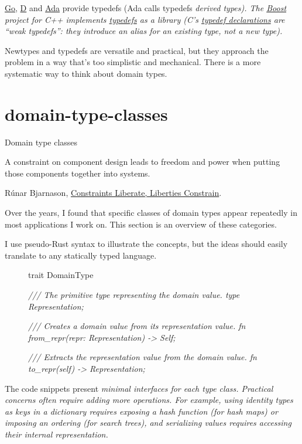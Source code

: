 \documentclass{article}
\begin{document}
\href{https://go.dev/ref/spec#Type_definitions}{Go}, \href{https://dlang.org/library/std/typecons/typedef.html}{D} and \href{https://en.wikibooks.org/wiki/Ada_Programming/Type_System#Derived_types}{Ada} provide typedefs (Ada calls typedefs \em{derived types}).
The \href{https://www.boost.org/}{Boost} project for C++ implements \href{https://www.boost.org/doc/libs/1_61_0/libs/serialization/doc/strong_typedef.html}{typedefs} as a library
(C's \href{https://en.cppreference.com/w/c/language/typedef}{typedef declarations} are ``weak typedefs'': they introduce an alias for an existing type, not a new type).

Newtypes and typedefs are versatile and practical, but they approach the problem in a way that's too simplistic and mechanical.
There is a more systematic way to think about domain types.

\section{domain-type-classes}{Domain type classes}

\epigraph{A constraint on component design leads to freedom and power when putting those components together into systems.}{
  Rúnar Bjarnason, \href{https://www.youtube.com/watch?v=GqmsQeSzMdw}{Constraints Liberate, Liberties Constrain}.
}

Over the years, I found that specific classes of domain types appear repeatedly in most applications I work on.
This section is an overview of these categories.

I use pseudo-Rust syntax to illustrate the concepts, but the ideas should easily translate to any statically typed language.

\begin{figure}
\begin{code}
trait DomainType {
  \em{/// The primitive type representing the domain value.}
  type Representation; \label{representation-type}

  \em{/// Creates a domain value from its representation value.}
  fn from_repr(repr: Representation) -> Self;

  \em{/// Extracts the representation value from the domain value.}
  fn to_repr(self) -> Representation;
}
\end{code}
\end{figure}

The code snippets present \em{minimal} interfaces for each type class.
Practical concerns often require adding more operations.
For example, using identity types as keys in a dictionary requires exposing a hash function (for hash maps) or imposing an ordering (for search trees), and serializing values requires accessing their internal representation.
\end{document}
